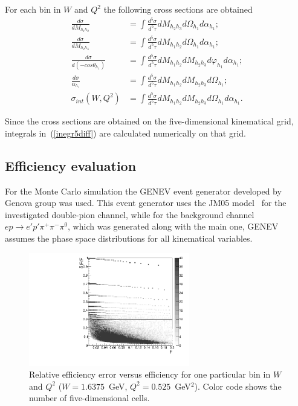 \documentclass[prc,twocolumn,superscriptaddress,showpacs,amssymb,amsmath,amsfonts,linenumbers,aps]{revtex4-1}
\begin{document}
For each bin in $W$ and $Q^2$ the following cross sections are obtained
\begin{equation}
\begin{aligned}
\frac{d\sigma}{dM_{h_{1}h_{2}}} & =
\int\frac{d^{5}\sigma}{d^{5}\tau}dM_{h_{2}h_{3}}d\Omega_{h_{1}}d\alpha_{h_{1}};  \\
\frac{d\sigma}{dM_{h_{2}h_{3}}} & =
\int\frac{d^{5}\sigma}{d^{5}\tau}dM_{h_{1}h_{2}}d\Omega_{h_{1}}d\alpha_{h_{1}}; \\
\frac{d\sigma}{d(-cos\theta_{h_{1}})} & =
\int\frac{d^{5}\sigma}{d^{5}\tau}dM_{h_{1}h_{2}}dM_{h_{2}h_{3}}d\varphi_{h_{1}}d\alpha_{h_{1}};  \\
\frac{d\sigma}{\alpha_{h_{1}}} & =
\int\frac{d^{5}\sigma}{d^{5}\tau} dM_{h_{1}h_{2}}dM_{h_{2}h_{3}}d\Omega_{h_{1}}; \\
\sigma_{int}(W,Q^{2}) & =
\int\frac{d^{5}\sigma}{d^{5}\tau}dM_{h_{1}h_{2}}dM_{h_{2}h_{3}}d\Omega_{h_{1}}d\alpha_{h_{1}}.
\end{aligned}
\label{inegr5diff}
\end{equation}

Since the cross sections are obtained on the
five-dimensional kinematical grid,
integrals in~(\ref{inegr5diff}) are calculated numerically 
on that grid. 








\subsection{Efficiency evaluation}
\label{eff_err}

For the Monte Carlo simulation the GENEV event generator developed by 
Genova group was used. This event generator uses the JM05 model~\cite{JM05} for the investigated double-pion channel,
while for the background channel $e p \rightarrow e'p'\pi^{+}\pi^{-}\pi^{0}$, which was generated along with the main one, GENEV assumes the phase space distributions for all kinematical variables.



\begin{figure}[htp]
\begin{center}
\includegraphics[width=7cm]{pictures/efficiency/eff_err.pdf}
\caption{\small Relative efficiency error versus efficiency for one particular bin in $W$ and $Q^2$ ($W = 1.6375$~GeV, $Q^2 = 0.525$~GeV$^2$). Color code shows the number of five-dimensional cells.} \label{fig:eff_err}
\end{center}
\end{figure}
\end{document}
